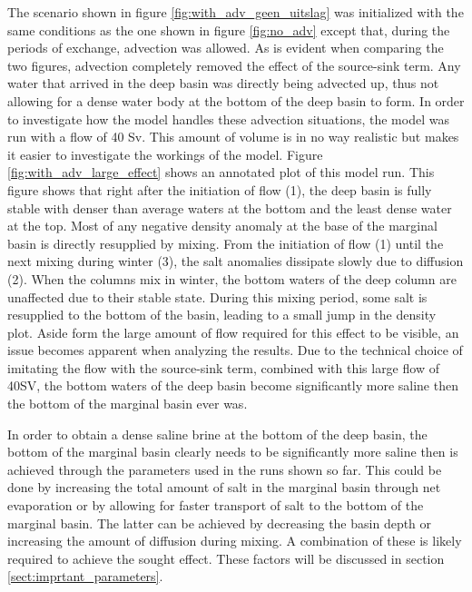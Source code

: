 \documentclass[twocolumn]{article}
\begin{document}
The scenario shown in figure \ref{fig:with_adv_geen_uitslag} was initialized with the same conditions as the one shown in figure \ref{fig:no_adv} except that, during the periods of exchange, advection was allowed. As is evident when comparing the two figures, advection completely removed the effect of the source-sink term. Any water that arrived in the deep basin was directly being advected up, thus not allowing for a dense water body at the bottom of the deep basin to form. In order to investigate how the model handles these advection situations, the model was run with a flow of 40 Sv. This amount of volume is in no way realistic but makes it easier to investigate the workings of the model. Figure \ref{fig:with_adv_large_effect} shows an annotated plot of this model run. This figure shows that right after the initiation of flow (1), the deep basin is fully stable with denser than average waters at the bottom and the least dense water at the top. Most of any negative density anomaly at the base of the marginal basin is directly resupplied by mixing. From the initiation of flow (1) until the next mixing during winter (3), the salt anomalies dissipate slowly due to diffusion (2). When the columns mix in winter, the bottom waters of the deep column are unaffected due to their stable state. During this mixing period, some salt is resupplied to the bottom of the basin, leading to a small jump in the density plot. 
Aside form the large amount of flow required for this effect to be visible, an issue becomes apparent when analyzing the results. Due to the technical choice of imitating the flow with the source-sink term, combined with this large flow of 40SV, the bottom waters of the deep basin become significantly more saline then the bottom of the marginal basin ever was. 

In order to obtain a dense saline brine at the bottom of the deep basin, the bottom of the marginal basin clearly needs to be significantly more saline then is achieved through the parameters used in the runs shown so far. This could be done by increasing the total amount of salt in the marginal basin through net evaporation or by allowing for faster transport of salt to the bottom of the marginal basin. The latter can be achieved by decreasing the basin depth or increasing the amount of diffusion during mixing. A combination of these is likely required to achieve the sought effect. These factors will be discussed in section \ref{sect:imprtant_parameters}.
\end{document}
